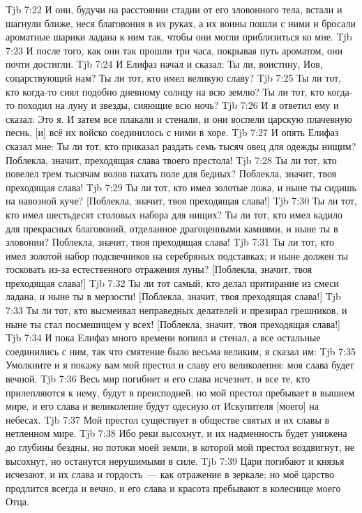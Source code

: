 \vs Tjb 7:22
И они, будучи на расстоянии стадии от его зловонного тела, встали и шагнули ближе, неся благовония в их руках, а их воины пошли с ними и бросали ароматные шарики ладана к ним так, чтобы они могли приблизиться ко мне.
\vs Tjb 7:23
И после того, как они так прошли три часа, покрывая путь ароматом, они почти достигли.
\vs Tjb 7:24
И Елифаз начал и сказал: Ты ли, воистину, Иов, соцарствующий нам? Ты ли тот, кто имел великую славу?
\vs Tjb 7:25
Ты ли тот, кто когда-то сиял подобно дневному солнцу на всю землю? Ты ли тот, кто когда-то походил на луну и звезды, сияющие всю ночь?
\vs Tjb 7:26
И я ответил ему и сказал: Это я. И затем все плакали и стенали, и они воспели царскую плачевную песнь, [и] всё их войско соединилось с ними в хоре.
\vs Tjb 7:27
И опять Елифаз сказал мне: Ты ли тот, кто приказал раздать семь тысяч овец для одежды нищим? Поблекла, значит, преходящая слава твоего престола!
\vs Tjb 7:28
Ты ли тот, кто повелел трем тысячам волов пахать поле для бедных? Поблекла, значит, твоя преходящая слава!
\vs Tjb 7:29
Ты ли тот, кто имел золотые ложа, и ныне ты сидишь на навозной куче? [Поблекла, значит, твоя преходящая слава!]
\vs Tjb 7:30
Ты ли тот, кто имел шестьдесят столовых набора для нищих? Ты ли тот, кто имел кадило для прекрасных благовоний, отделанное драгоценными камнями, и ныне ты в зловонии? Поблекла, значит, твоя преходящая слава!
\vs Tjb 7:31
Ты ли тот, кто имел золотой набор подсвечников на серебряных подставках; и ныне должен ты тосковать из-за естественного отражения луны? [Поблекла, значит, твоя преходящая слава!]
\vs Tjb 7:32
Ты ли тот самый, кто делал притирание из смеси ладана, и ныне ты в мерзости! [Поблекла, значит, твоя преходящая слава!]
\vs Tjb 7:33
Ты ли тот, кто высмеивал неправедных делателей и презирал грешников, и ныне ты стал посмешищем у всех! [Поблекла, значит, твоя преходящая слава!]
\vs Tjb 7:34
И пока Eлифаз много времени вопиял и стенал, а все остальные соединились с ним, так что смятение было весьма великим, я сказал им:
\vs Tjb 7:35
Умолкните и я покажу вам мой престол и славу его великолепия: моя слава будет вечной.
\vs Tjb 7:36
Весь мир погибнет и его слава исчезнет, и все те, кто прилепляются к нему, будут в преисподней, но мой престол пребывает в вышнем мире, и его слава и великолепие будут одесную от Искупителя [моего] на небесах.
\vs Tjb 7:37
Мой престол существует в обществе святых и их славы в нетленном мире.
\vs Tjb 7:38
Ибо реки высохнут, и их надменность будет унижена до глубины бездны, но потоки моей земли, в которой мой престол воздвигнут, не высохнут, но останутся нерушимыми в силе.
\vs Tjb 7:39
Цари погибают и князья исчезают, и их слава и гордость~--- как отражение в зеркале; но моё царство продлится всегда и вечно, и его слава и красота пребывают в колеснице моего Отца.

